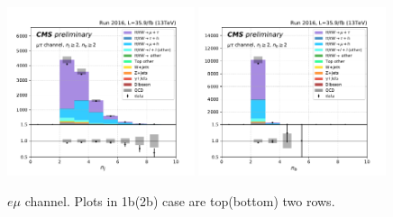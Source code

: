 \begin{figure}[ht]
    \includegraphics[width=0.49\textwidth]{chapters/Appendix/sectionPlots/figures/kinematics_pickles/mutau/2b/mutau_2b_nJets.pdf}
    \includegraphics[width=0.49\textwidth]{chapters/Appendix/sectionPlots/figures/kinematics_pickles/mutau/2b/mutau_2b_nBJets.pdf}
    
    \caption{$e\mu$ channel. Plots in 1b(2b) case are top(bottom) two rows.}
\end{figure}


